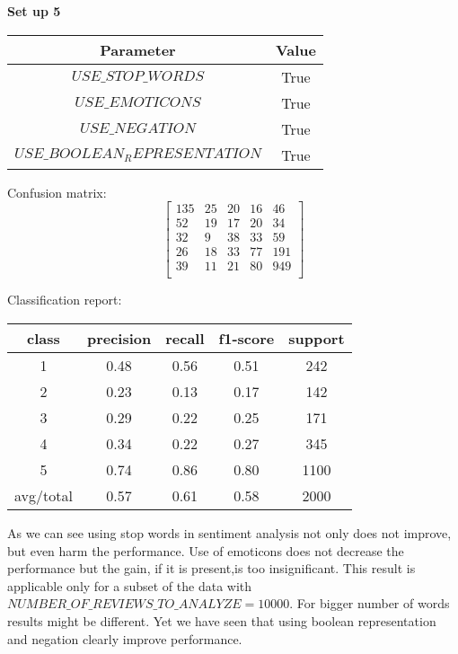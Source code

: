 \documentclass[12pt]{report}
\begin{document}
\textbf{Set up 5}

\begin{center}
	\begin{tabular}{ c | c }
		\hline
		Parameter & Value \\ \hline
		$USE\_STOP\_WORDS$ & True \\ \hline
		$USE\_EMOTICONS$ & True \\ \hline
		$USE\_NEGATION$ & True \\ \hline
		$USE\_BOOLEAN_REPRESENTATION$ & True \\ \hline
	\end{tabular}
\end{center}

Confusion matrix:
\[
\begin{bmatrix}
135 & 25 & 20 & 16 & 46 \\
52 & 19 & 17 & 20 & 34 \\
32 &  9 & 38 & 33 & 59 \\
26 & 18 & 33 & 77 & 191 \\
39 & 11 & 21 & 80 & 949 \\
\end{bmatrix}
\]

Classification report:

\begin{center}
	\begin{tabular}{c | c | c | c | c }
		\hline
		class & precision & recall & f1-score & support \\ \hline
		1 & 0.48 & 0.56 & 0.51 & 242 \\ \hline
		2 & 0.23 & 0.13 & 0.17 & 142 \\ \hline
		3 & 0.29 & 0.22 & 0.25 & 171 \\ \hline
		4 & 0.34 & 0.22 & 0.27 & 345 \\ \hline
		5 & 0.74 & 0.86 & 0.80 & 1100 \\ \hline
		avg/total & 0.57 & 0.61 & 0.58 & 2000 \\ \hline
	\end{tabular}
\end{center}

As we can see using stop words in sentiment analysis not only does not improve, but even harm the performance. Use of emoticons does not decrease the performance but the gain, if it is present,is too insignificant.
This result is applicable only for a subset of the data with $NUMBER\_OF\_REVIEWS\_TO\_ANALYZE = 10000$. For bigger number of words results might be different. Yet we have seen that using boolean representation and negation clearly improve performance.
\end{document}
